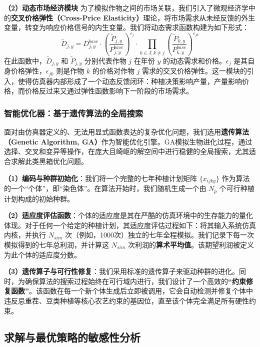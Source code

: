 \documentclass[withoutpreface,bwprint]{cumcmthesis} %
\begin{document}
\textbf{（2）动态市场经济模块}
为了模拟作物之间的市场关联，我们引入了微观经济学中的\textbf{交叉价格弹性（Cross-Price Elasticity）}理论，将市场需求从未经反馈的外生变量，转变为响应价格信号的内生变量。我们将动态需求函数构建为如下形式：
\begin{equation}
\tilde{D}_{j,y} = D_{j,y}^{base} \cdot \left(\frac{\tilde{P}_{j,y}}{P_{j,y}^{base}}\right)^{\epsilon_j} \cdot \prod_{k \in J, k \neq j} \left(\frac{\tilde{P}_{k,y}}{P_{k,y}^{base}}\right)^{\epsilon_{jk}}
\end{equation}
在此函数中，$\tilde{D}_{j,y}$ 和 $\tilde{P}_{j,y}$ 分别代表作物 $j$ 在年份 $y$ 的动态需求和价格。$\epsilon_j$ 是其自身价格弹性，$\epsilon_{jk}$ 则是作物 $k$ 的价格对作物 $j$ 需求的交叉价格弹性。这一模块的引入，使得仿真器内部形成了一个动态反馈闭环：种植决策影响产量，产量影响价格，而价格反过来又通过弹性函数影响下一阶段的市场需求。

\subsubsection{智能优化器：基于遗传算法的全局搜索}

面对由仿真器定义的、无法用显式函数表达的复杂优化问题，我们选用\textbf{遗传算法（Genetic Algorithm, GA）}作为智能优化引擎。GA模拟生物进化过程，通过选择、交叉和变异等操作，在庞大且崎岖的解空间中进行稳健的全局搜索，尤其适合求解此类黑箱优化问题。

\textbf{（1）编码与种群初始化}：我们将一个完整的七年种植计划矩阵 $\{x_{ijky}\}$ 作为算法的一个“个体”，即“染色体”。在算法开始时，我们随机生成一个由 $N_p$ 个可行种植计划构成的初始种群。

\textbf{（2）适应度评估函数}：个体的适应度是其在严酷的仿真环境中的生存能力的量化体现。对于任何一个给定的种植计划，其适应度评估过程如下：将其输入系统仿真内核，并执行 $N_{sim}$ 次（例如，1000次）独立的七年全程模拟。我们记录下每一次模拟得到的七年总利润，并计算这 $N_{sim}$ 次利润的\textbf{算术平均值}。该期望利润被定义为此个体的适应度分数。

\textbf{（3）遗传算子与可行性修复}：我们采用标准的遗传算子来驱动种群的进化。同时，为确保算法的搜索过程始终在可行域内进行，我们设计了一个高效的\textbf{“约束修复函数”}。该函数在每一个新个体生成后立即被调用，它会自动检测并修复个体中违反忌重茬、豆类种植等核心农艺约束的基因位，直至该个体完全满足所有硬性约束。

\subsection{求解与最优策略的敏感性分析}
\end{document}
